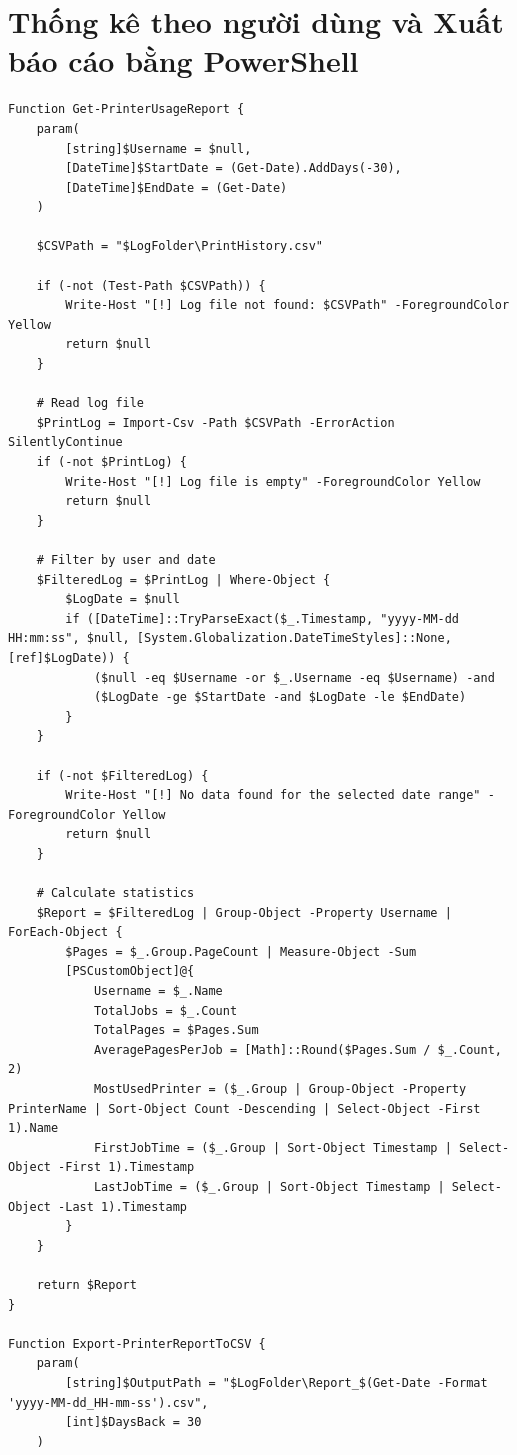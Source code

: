 \section{Thống kê theo người dùng và Xuất báo cáo bằng PowerShell}
\begin{lstlisting}[style=powershell]
Function Get-PrinterUsageReport {
    param(
        [string]$Username = $null,
        [DateTime]$StartDate = (Get-Date).AddDays(-30),
        [DateTime]$EndDate = (Get-Date)
    )
    
    $CSVPath = "$LogFolder\PrintHistory.csv"
    
    if (-not (Test-Path $CSVPath)) {
        Write-Host "[!] Log file not found: $CSVPath" -ForegroundColor Yellow
        return $null
    }
    
    # Read log file
    $PrintLog = Import-Csv -Path $CSVPath -ErrorAction SilentlyContinue
    if (-not $PrintLog) {
        Write-Host "[!] Log file is empty" -ForegroundColor Yellow
        return $null
    }
    
    # Filter by user and date
    $FilteredLog = $PrintLog | Where-Object {
        $LogDate = $null
        if ([DateTime]::TryParseExact($_.Timestamp, "yyyy-MM-dd HH:mm:ss", $null, [System.Globalization.DateTimeStyles]::None, [ref]$LogDate)) {
            ($null -eq $Username -or $_.Username -eq $Username) -and
            ($LogDate -ge $StartDate -and $LogDate -le $EndDate)
        }
    }
    
    if (-not $FilteredLog) {
        Write-Host "[!] No data found for the selected date range" -ForegroundColor Yellow
        return $null
    }
    
    # Calculate statistics
    $Report = $FilteredLog | Group-Object -Property Username | ForEach-Object {
        $Pages = $_.Group.PageCount | Measure-Object -Sum
        [PSCustomObject]@{
            Username = $_.Name
            TotalJobs = $_.Count
            TotalPages = $Pages.Sum
            AveragePagesPerJob = [Math]::Round($Pages.Sum / $_.Count, 2)
            MostUsedPrinter = ($_.Group | Group-Object -Property PrinterName | Sort-Object Count -Descending | Select-Object -First 1).Name
            FirstJobTime = ($_.Group | Sort-Object Timestamp | Select-Object -First 1).Timestamp
            LastJobTime = ($_.Group | Sort-Object Timestamp | Select-Object -Last 1).Timestamp
        }
    }
    
    return $Report
}
 
Function Export-PrinterReportToCSV {
    param(
        [string]$OutputPath = "$LogFolder\Report_$(Get-Date -Format 'yyyy-MM-dd_HH-mm-ss').csv",
        [int]$DaysBack = 30
    )
    

\end{lstlisting}
